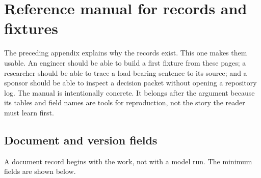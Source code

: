 \chapter{Reference manual for records and fixtures}
\label{ch:reference-manual}

The preceding appendix explains why the records exist. This one makes them
usable. An engineer should be able to build a first fixture from these pages;
a researcher should be able to trace a load-bearing sentence to its source; and
a sponsor should be able to inspect a decision packet without opening a
repository log. The manual is intentionally concrete. It belongs after the
argument because its tables and field names are tools for reproduction, not the
story the reader must learn first.

\section{Document and version fields}
\label{sec:manual-document-fields}

A document record begins with the work, not with a model run. The minimum fields
are shown below.

